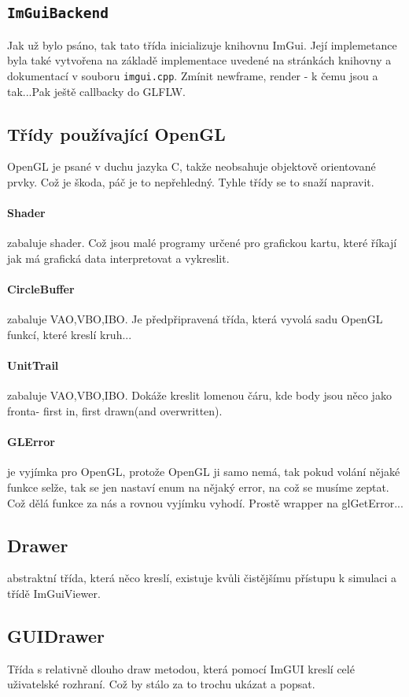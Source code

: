 \subsection{\texttt{ImGuiBackend}}
Jak už bylo psáno, tak tato třída inicializuje knihovnu ImGui. Její implemetance byla také vytvořena na základě implementace uvedené na stránkách knihovny a dokumentací v souboru \texttt{imgui.cpp}.
Zmínit newframe, render - k čemu jsou a tak...Pak ještě callbacky do GLFLW.
\subsection{Třídy používající OpenGL}
OpenGL je psané v duchu jazyka C, takže neobsahuje objektově orientované prvky. Což je škoda, páč je to nepřehledný. Tyhle třídy se to snaží napravit.
\paragraph{Shader} zabaluje shader. Což jsou malé programy určené pro grafickou kartu, které říkají jak má grafická data interpretovat a vykreslit.
\paragraph{CircleBuffer} zabaluje VAO,VBO,IBO. Je předpřipravená třída, která vyvolá sadu OpenGL funkcí, které kreslí kruh...
\paragraph{UnitTrail} zabaluje VAO,VBO,IBO. Dokáže kreslit lomenou čáru, kde body jsou něco jako fronta- first in, first drawn(and overwritten).
\paragraph{GLError} je vyjímka pro OpenGL, protože OpenGL ji samo nemá, tak pokud volání nějaké funkce selže, tak se jen nastaví enum na nějaký error, na což se musíme zeptat. Což dělá funkce za nás a rovnou vyjímku vyhodí. Prostě wrapper na glGetError...
\subsection{Drawer}
abstraktní třída, která něco kreslí, existuje kvůli čistějšímu přístupu k simulaci a třídě ImGuiViewer.
\subsection{GUIDrawer}
Třída s relativně dlouho draw metodou, která pomocí ImGUI kreslí celé uživatelské rozhraní. Což by stálo za to trochu ukázat a popsat.
